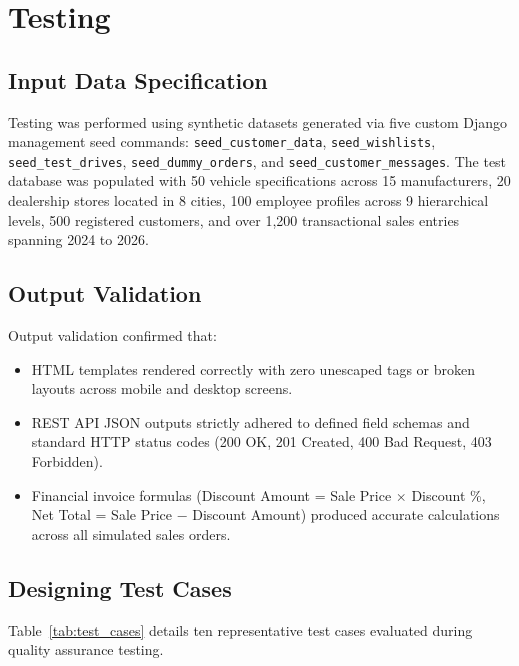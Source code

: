 \section{Testing}

\subsection{Input Data Specification}
Testing was performed using synthetic datasets generated via five custom Django management seed commands: \texttt{seed\_customer\_data}, \texttt{seed\_wishlists}, \texttt{seed\_test\_drives}, \texttt{seed\_dummy\_orders}, and \texttt{seed\_customer\_messages}. The test database was populated with 50 vehicle specifications across 15 manufacturers, 20 dealership stores located in 8 cities, 100 employee profiles across 9 hierarchical levels, 500 registered customers, and over 1,200 transactional sales entries spanning 2024 to 2026.

\subsection{Output Validation}
Output validation confirmed that:
\begin{itemize}
    \item HTML templates rendered correctly with zero unescaped tags or broken layouts across mobile and desktop screens.
    \item REST API JSON outputs strictly adhered to defined field schemas and standard HTTP status codes (200 OK, 201 Created, 400 Bad Request, 403 Forbidden).
    \item Financial invoice formulas (Discount Amount = Sale Price $\times$ Discount \%, Net Total = Sale Price $-$ Discount Amount) produced accurate calculations across all simulated sales orders.
\end{itemize}

\subsection{Designing Test Cases}
Table~\ref{tab:test_cases} details ten representative test cases evaluated during quality assurance testing.

